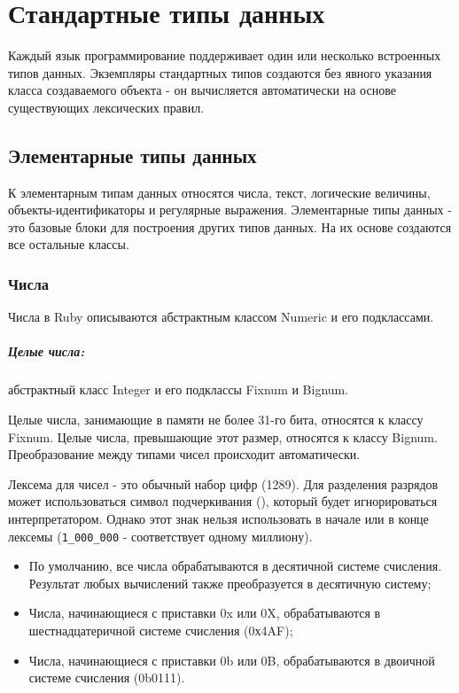 \chapter{Стандартные типы данных}

Каждый язык программирование поддерживает один или несколько встроенных типов данных. Экземпляры стандартных типов создаются без явного указания класса создаваемого объекта - он вычисляется автоматически на основе существующих лексических правил.

\section{Элементарные типы данных}

К элементарным типам данных относятся числа, текст, логические величины, объекты-идентификаторы и регулярные выражения. Элементарные типы данных - это базовые блоки для построения других типов данных. На их основе создаются все остальные классы.

\subsection{Числа}

Числа в Ruby описываются абстрактным классом Numeric и его подклассами.

\paragraph*{Целые числа:} абстрактный класс Integer и его подклассы Fixnum и Bignum.

Целые числа, занимающие в памяти не более 31-го бита, относятся к классу Fixnum. Целые числа, превышающие этот размер, относятся к классу Bignum. Преобразование между типами чисел происходит автоматически.

Лексема для чисел - это обычный набор цифр (1289). Для разделения разрядов может использоваться символ подчеркивания (\mono{_}), который будет игнорироваться интерпретатором. Однако этот знак нельзя использовать в начале или в конце лексемы (\verb!1_000_000! - соответствует одному миллиону). 

\begin{itemize}
  \item По умолчанию, все числа обрабатываются в десятичной системе счисления. Результат любых вычислений также преобразуется в десятичную систему;

  \item Числа, начинающиеся с приставки 0x или 0X, обрабатываются в шестнадцатеричной системе счисления (0х4AF);

  \item Числа, начинающиеся с приставки 0b или 0B, обрабатываются в двоичной системе счисления (0b0111).
\end{itemize}

